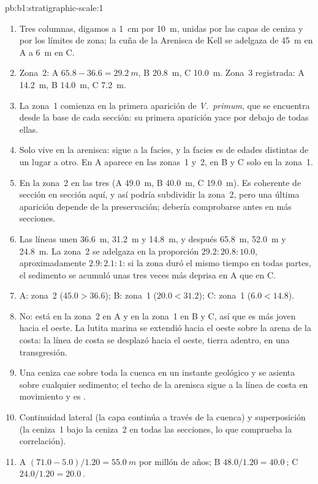 \begin{solution}{pb:b1:stratigraphic-scale:1}
\begin{enumerate}
  \item Tres columnas, digamos a \qty{1}{cm} por \qty{10}{m}, unidas por las capas de ceniza y por los límites de zona; la cuña de la Arenisca de Kell se adelgaza de \qty{45}{m} en A a \qty{6}{m} en C.
  \item Zona~2: A $65.8 - 36.6 = \qty{29.2}{m}$, B \qty{20.8}{m}, C \qty{10.0}{m}. Zona~3 registrada: A \qty{14.2}{m}, B \qty{14.0}{m}, C \qty{7.2}{m}.
  \item La zona~1 comienza en la primera aparición de \emph{V.~primum}, que se encuentra desde la base de cada sección: su primera aparición yace por debajo de todas ellas.
  \item Solo vive en la arenisca: sigue a la facies, y la facies es de edades distintas de un lugar a otro. En A aparece en las zonas~1 y~2, en B y C solo en la zona~1.
  \item En la zona~2 en las tres (A \qty{49.0}{m}, B \qty{40.0}{m}, C \qty{19.0}{m}). Es coherente de sección en sección aquí, y así podría subdividir la zona~2, pero una última aparición depende de la preservación; debería comprobarse antes en más secciones.
  \item Las líneas unen \qty{36.6}{m}, \qty{31.2}{m} y \qty{14.8}{m}, y después \qty{65.8}{m}, \qty{52.0}{m} y \qty{24.8}{m}. La zona~2 se adelgaza en la proporción $29.2 : 20.8 : 10.0$, aproximadamente $2.9 : 2.1 : 1$: si la zona duró el mismo tiempo en todas partes, el sedimento se acumuló unas tres veces más deprisa en A que en C.
  \item A: zona~2 ($45.0 > 36.6$); B: zona~1 ($20.0 < 31.2$); C: zona~1 ($6.0 < 14.8$).
  \item No: está en la zona~2 en A y en la zona~1 en B y C, así que es más joven hacia el oeste. La lutita marina se extendió hacia el oeste sobre la arena de la costa: la línea de costa se desplazó hacia el oeste, tierra adentro, en una transgresión.
  \item Una ceniza cae sobre toda la cuenca en un instante geológico y se asienta sobre cualquier sedimento; el techo de la arenisca sigue a la línea de costa en movimiento y es .
  \item Continuidad lateral (la capa continúa a través de la cuenca) y superposición (la ceniza~1 bajo la ceniza~2 en todas las secciones, lo que comprueba la correlación).
  \item A $(71.0 - 5.0)/1.20 = \qty{55.0}{m}$ por millón de años; B $48.0/1.20 = \qty{40.0}{}$; C $24.0/1.20 = \qty{20.0}{}$.

\end{enumerate}
\end{solution}
